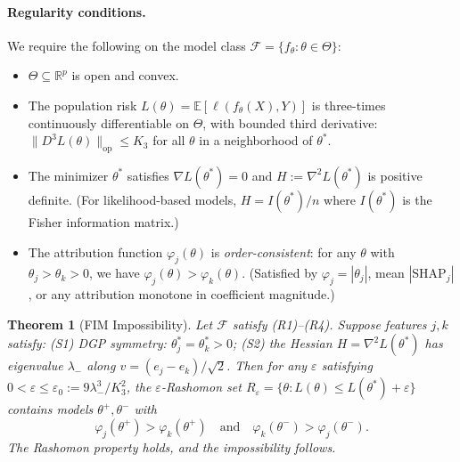 \documentclass{article}
\newtheorem{theorem}{Theorem}
\newcommand{\R}{\mathbb{R}}
\newcommand{\E}{\mathbb{E}}
\begin{document}
\paragraph{Regularity conditions.}
We require the following on the model class $\mathcal{F} = \{f_\theta : \theta \in \Theta\}$:
\begin{itemize}
    \item[\textbf{(R1)}] $\Theta \subseteq \R^p$ is open and convex.
    \item[\textbf{(R2)}] The population risk $L(\theta) = \E[\ell(f_\theta(X), Y)]$ is three-times continuously differentiable on $\Theta$, with bounded third derivative: $\|D^3 L(\theta)\|_{\text{op}} \leq K_3$ for all $\theta$ in a neighborhood of $\theta^*$.
    \item[\textbf{(R3)}] The minimizer $\theta^*$ satisfies $\nabla L(\theta^*) = 0$ and $H := \nabla^2 L(\theta^*)$ is positive definite. (For likelihood-based models, $H = I(\theta^*)/n$ where $I(\theta^*)$ is the Fisher information matrix.)
    \item[\textbf{(R4)}] The attribution function $\varphi_j(\theta)$ is \emph{order-consistent}: for any $\theta$ with $\theta_j > \theta_k > 0$, we have $\varphi_j(\theta) > \varphi_k(\theta)$. (Satisfied by $\varphi_j = |\theta_j|$, mean $|\text{SHAP}_j|$, or any attribution monotone in coefficient magnitude.)
\end{itemize}

\begin{theorem}[FIM Impossibility]
\label{thm:fim-impossibility}
Let $\mathcal{F}$ satisfy (R1)--(R4). Suppose features $j, k$ satisfy: (S1) DGP symmetry: $\theta^*_j = \theta^*_k > 0$; (S2) the Hessian $H = \nabla^2 L(\theta^*)$ has eigenvalue $\lambda_-$ along $v = (e_j - e_k)/\sqrt{2}$. Then for any $\varepsilon$ satisfying $0 < \varepsilon \leq \varepsilon_0 := 9\lambda_-^3/K_3^2$, the $\varepsilon$-Rashomon set $R_\varepsilon = \{\theta : L(\theta) \leq L(\theta^*) + \varepsilon\}$ contains models $\theta^+, \theta^-$ with
\[
    \varphi_j(\theta^+) > \varphi_k(\theta^+) \quad\text{and}\quad \varphi_k(\theta^-) > \varphi_j(\theta^-).
\]
The Rashomon property holds, and the impossibility follows.
\end{theorem}
\end{document}
